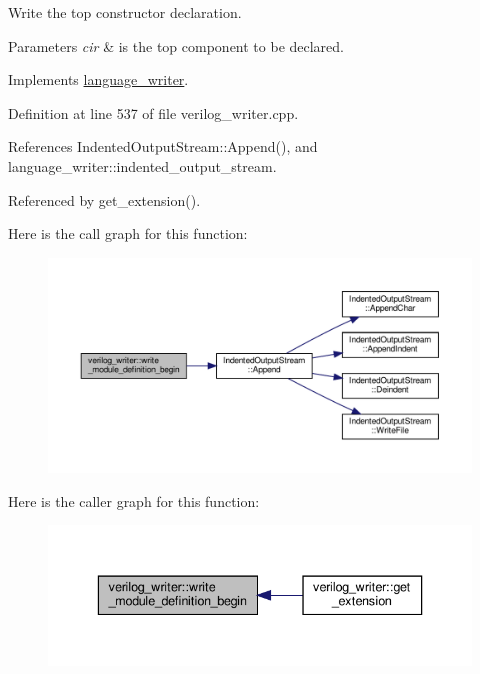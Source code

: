 Write the top constructor declaration. 


\begin{DoxyParams}{Parameters}
{\em cir} & is the top component to be declared. \\
\hline
\end{DoxyParams}


Implements \hyperlink{classlanguage__writer_a53b7db2b1ad81b2ee89ff81705b0f0ff}{language\+\_\+writer}.



Definition at line 537 of file verilog\+\_\+writer.\+cpp.



References Indented\+Output\+Stream\+::\+Append(), and language\+\_\+writer\+::indented\+\_\+output\+\_\+stream.



Referenced by get\+\_\+extension().

Here is the call graph for this function\+:
\nopagebreak
\begin{figure}[H]
\begin{center}
\leavevmode
\includegraphics[width=350pt]{d8/dba/classverilog__writer_a8c7225cfbd24b813da3fc7a790ff1e1c_cgraph}
\end{center}
\end{figure}
Here is the caller graph for this function\+:
\nopagebreak
\begin{figure}[H]
\begin{center}
\leavevmode
\includegraphics[width=336pt]{d8/dba/classverilog__writer_a8c7225cfbd24b813da3fc7a790ff1e1c_icgraph}
\end{center}
\end{figure}
\mbox{\label{classverilog__writer_aeb32328c5b805c13c4fc86a5576e82d4}} 

